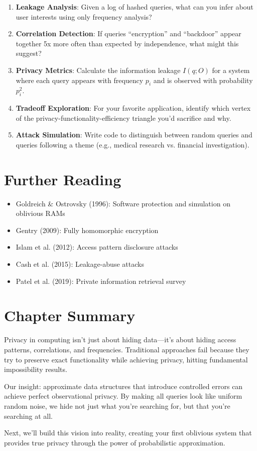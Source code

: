 \begin{enumerate}
\item \textbf{Leakage Analysis}: Given a log of hashed queries, what can you infer about user interests using only frequency analysis?

\item \textbf{Correlation Detection}: If queries ``encryption'' and ``backdoor'' appear together 5x more often than expected by independence, what might this suggest?

\item \textbf{Privacy Metrics}: Calculate the information leakage $I(q; O)$ for a system where each query appears with frequency $p_i$ and is observed with probability $p_i^2$.

\item \textbf{Tradeoff Exploration}: For your favorite application, identify which vertex of the privacy-functionality-efficiency triangle you'd sacrifice and why.

\item \textbf{Attack Simulation}: Write code to distinguish between random queries and queries following a theme (e.g., medical research vs. financial investigation).
\end{enumerate}

\section{Further Reading}

\begin{itemize}
\item Goldreich \& Ostrovsky (1996): Software protection and simulation on oblivious RAMs
\item Gentry (2009): Fully homomorphic encryption
\item Islam et al. (2012): Access pattern disclosure attacks
\item Cash et al. (2015): Leakage-abuse attacks
\item Patel et al. (2019): Private information retrieval survey
\end{itemize}

\section{Chapter Summary}

Privacy in computing isn't just about hiding data---it's about hiding access patterns, correlations, and frequencies. Traditional approaches fail because they try to preserve exact functionality while achieving privacy, hitting fundamental impossibility results.

Our insight: approximate data structures that introduce controlled errors can achieve perfect observational privacy. By making all queries look like uniform random noise, we hide not just what you're searching for, but that you're searching at all.

Next, we'll build this vision into reality, creating your first oblivious system that provides true privacy through the power of probabilistic approximation.